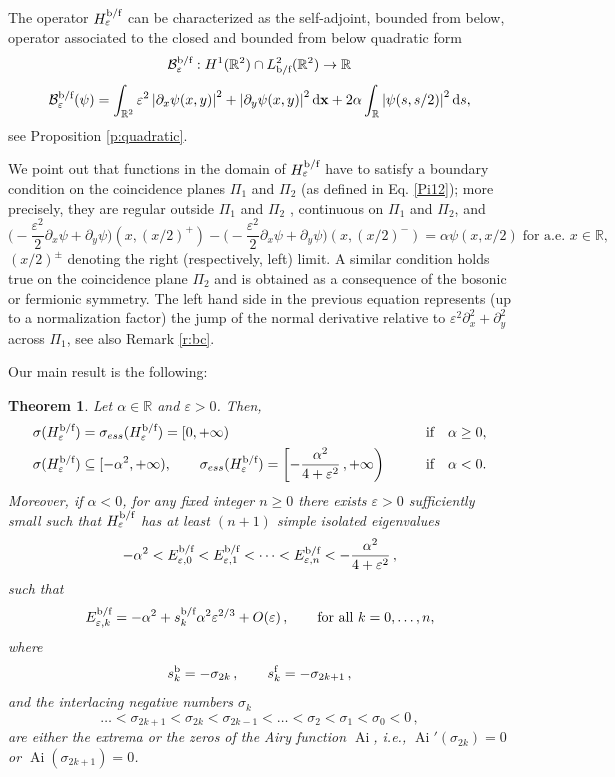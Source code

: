 \documentclass[a4paper,11pt,reqno]{amsart}
\newtheorem{theorem}{Theorem}[section]
\theoremstyle{definition}
\numberwithin{equation}{section}
\newcommand{\RE}{\mathbb R}
\newcommand{\rr}{\mathbb R}
\newcommand{\BB}{\mathcal B}
\newcommand{\ve}{\varepsilon}
\renewcommand{\d}{\mathrm{d}}
\newcommand{\x}{{\bf  x}}
\newcommand{\Ai}{\operatorname{Ai}}
\newcommand{\bof}{\text{\rm b/f}}
\newcommand{\bos}{\text{\rm b}}
\newcommand{\fer}{\text{\rm f}}
\newcommand{\eigenvalueH}{E}
\begin{document}
The operator   $H^{\bof}_\ve$ can be  characterized as the self-adjoint, bounded from below, operator associated to the closed and bounded from below quadratic form 
\[
\BB^{\bof}_{\ve}: H^1(\RE^2)\cap  L^2_{\bof}(\RE^2)\to\RE 
\]
\[
\BB^{\bof}_{\ve}(\psi)= \int_{\RE^2} \ve^2\left|\partial_x \psi(x,y)\right|^2+\left| \partial_y \psi(x,y)\right|^2  \d\x +2 \alpha
 \int_{\RE} \left|\psi(s,s/2) \right|^2   \d s, 
\]
see Proposition \ref{p:quadratic}.

We point out that functions in  the domain of $H^{\bof}_\ve$ have to satisfy a  boundary condition on the coincidence planes $\Pi_1$ and $\Pi_2$ (as defined in Eq. \eqref{Pi12}); more precisely,  they  are regular outside  $\Pi_1$ and $\Pi_2$ , continuous on $\Pi_1$ and $\Pi_2$, and 
\begin{equation}\label{explicitBC}
\Big(- \frac{ \ve^2}{2} \partial_x  \psi   +  \partial_y \psi \Big)(x,(x/2)^+) - 
\Big(- \frac{ \ve^2}{2} \partial_x  \psi   +  \partial_y \psi  \Big)(x,(x/2)^-) 
 = \alpha  \psi(x,x/2) \; \text{for a.e. $x\in\RE$},
\end{equation}
$(x/2)^\pm$ denoting the right (respectively, left) limit. A  similar condition holds true on the coincidence plane $\Pi_2$ and is  obtained as a consequence of the bosonic or fermionic symmetry. The left hand side in the previous equation represents (up to a normalization factor) the jump of the normal derivative relative to $ \ve^2 \partial^2_{x}+\partial^2_{y}$ across $\Pi_1$, see also Remark \ref{r:bc}.


Our main result is the following: 

 \begin{theorem}\label{th:main}
 Let $\alpha  \in \rr$ and $\ve>0$.  Then, 
\begin{equation}\label{spectrum1}
    \begin{aligned}
        & \sigma(H^{\bof}_\ve)=\sigma_{ess}(H^{\bof}_\ve) =[0,+\infty)  &&\text{if}\quad  \alpha \geq 0, \\
        & \sigma(H^{\bof}_\ve)\subseteq [-\alpha^{2},+\infty),\qquad   \sigma_{ess}(H^{\bof}_\ve)=\left[-\frac{\alpha^2}{4+\ve^{2}}\,,+\infty\right) 
         \qquad &&\text{if} \quad \alpha < 0.
    \end{aligned}
\end{equation}
Moreover, if  $\alpha<0$,  for any  fixed  integer $n\ge0$ there exists $\ve>0$ sufficiently small such that $H^{\bof}_\ve$ has at least $(n+1)$  simple isolated eigenvalues 
\[
-\alpha^{2}<\eigenvalueH^{\bof}_{\ve,0}<\eigenvalueH^{\bof}_{\ve,1}<\dots<\eigenvalueH^{\bof}_{\ve,n}<-\frac{\alpha^2}{4+\ve^{2}}\,,\]
such that 
\[
            \eigenvalueH^{\bof}_{\ve, k}  = -\alpha^2 +  s_{k}^{\bof}\alpha^2\ve^{2/3} + O (\ve) \, , \qquad \text{for all }k=0,\dots, n,
\]
    where 
    \[ s_{k}^{\bos}=-\sigma_{2k}\,,\qquad s_{k}^{\fer}=-\sigma_{2k+1}\,,\]
    and the interlacing negative numbers $\sigma_{k}$ 
    \[
    \dots<
    \sigma_{2k+1}<\sigma_{2k}<\sigma_{2k-1}<\dots<\sigma_{2}<\sigma_{1}<\sigma_{0}<0
    \,,
    \] 
    are either the  extrema or the zeros of the Airy function $\Ai$, i.e., $\Ai'(\sigma_{2k})=0$ or $ \Ai(\sigma_{2k+1})=0$.
\end{theorem}
\end{document}
